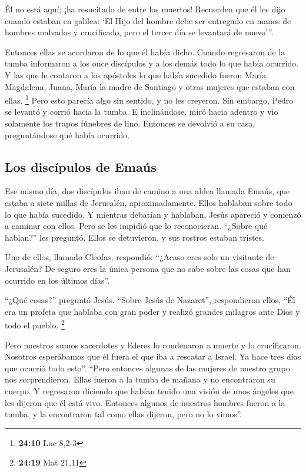  Él no está aquí; ¡ha resucitado de entre los muertos!
Recuerden que él les dijo cuando estaban en galilea:  `El
Hijo del hombre debe ser entregado en manos de hombres malvados y
crucificado, pero el tercer día se levantará de nuevo'''.

 Entonces ellas se acordaron de lo que él había dicho.
 Cuando regresaron de la tumba informaron a los once
discípulos y a los demás todo lo que había ocurrido.  Y
las que le contaron a los apóstoles lo que había sucedido fueron María
Magdalena, Juana, María la madre de Santiago y otras mujeres que estaban
con ellas. \footnote{\textbf{24:10} Luc 8,2-3}  Pero esto
parecía algo sin sentido, y no les creyeron.  Sin
embargo, Pedro se levantó y corrió hacia la tumba. E inclinándose, miró
hacia adentro y vio solamente los trapos fúnebres de lino. Entonces se
devolvió a su casa, preguntándose qué había ocurrido.

\hypertarget{los-discuxedpulos-de-emauxfas}{%
\subsection{Los discípulos de
Emaús}\label{los-discuxedpulos-de-emauxfas}}

 Ese mismo día, dos discípulos iban de camino a una aldea
llamada Emaús, que estaba a siete millas de Jerusalén, aproximadamente.
 Ellos hablaban sobre todo lo que había sucedido.
 Y mientras debatían y hablaban, Jesús apareció y comenzó
a caminar con ellos.  Pero se les impidió que lo
reconocieran.  ``¿Sobre qué hablan?'' les preguntó. Ellos
se detuvieron, y sus rostros estaban tristes.

 Uno de ellos, llamado Cleofas, respondió: ``¿Acaso eres
solo un visitante de Jerusalén? De seguro eres la única persona que no
sabe sobre las cosas que han ocurrido en los últimos días''.

 ``¿Qué cosas?'' preguntó Jesús. ``Sobre Jesús de
Nazaret'', respondieron ellos, ``Él era un profeta que hablaba con gran
poder y realizó grandes milagros ante Dios y todo el pueblo. \footnote{\textbf{24:19}
  Mat 21,11}

 Pero nuestros sumos sacerdotes y líderes lo condenaron a
muerte y lo crucificaron.  Nosotros esperábamos que él
fuera el que iba a rescatar a Israel. Ya hace tres días que ocurrió todo
esto''.  ``Pero entonces algunas de las mujeres de
nuestro grupo nos sorprendieron.  Ellas fueron a la tumba
de mañana y no encontraron su cuerpo. Y regresaron diciendo que habían
tenido una visión de unos ángeles que les dijeron que él está vivo.
 Entonces algunos de nuestros hombres fueron a la tumba,
y la encontraron tal como ellas dijeron, pero no lo vimos''.

